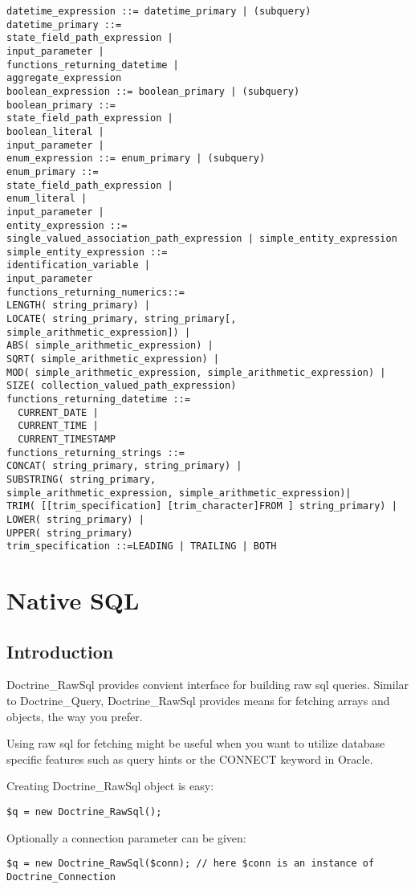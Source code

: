 \documentclass[11pt,a4paper]{report}
\begin{document}
\begin{verbatim}
datetime_expression ::= datetime_primary | (subquery)
datetime_primary ::=
state_field_path_expression |
input_parameter |
functions_returning_datetime |
aggregate_expression
boolean_expression ::= boolean_primary | (subquery)
boolean_primary ::=
state_field_path_expression |
boolean_literal |
input_parameter |
enum_expression ::= enum_primary | (subquery)
enum_primary ::=
state_field_path_expression |
enum_literal |
input_parameter |
entity_expression ::=
single_valued_association_path_expression | simple_entity_expression
simple_entity_expression ::=
identification_variable |
input_parameter
functions_returning_numerics::=
LENGTH( string_primary) |
LOCATE( string_primary, string_primary[, simple_arithmetic_expression]) |
ABS( simple_arithmetic_expression) |
SQRT( simple_arithmetic_expression) |
MOD( simple_arithmetic_expression, simple_arithmetic_expression) |
SIZE( collection_valued_path_expression)
functions_returning_datetime ::=
  CURRENT_DATE |
  CURRENT_TIME |
  CURRENT_TIMESTAMP
functions_returning_strings ::=
CONCAT( string_primary, string_primary) |
SUBSTRING( string_primary,
simple_arithmetic_expression, simple_arithmetic_expression)|
TRIM( [[trim_specification] [trim_character]FROM ] string_primary) |
LOWER( string_primary) |
UPPER( string_primary)
trim_specification ::=LEADING | TRAILING | BOTH
\end{verbatim}

\chapter{Native SQL}
\section{Introduction}
Doctrine\_RawSql provides convient interface for building raw sql queries. Similar to Doctrine\_Query, Doctrine\_RawSql provides means for fetching arrays and objects, the way you prefer.

Using raw sql for fetching might be useful when you want to utilize database specific features such as query hints or the CONNECT keyword in Oracle.

Creating Doctrine\_RawSql object is easy:

\begin{verbatim}
$q = new Doctrine_RawSql();
\end{verbatim}

Optionally a connection parameter can be given:

\begin{verbatim}
$q = new Doctrine_RawSql($conn); // here $conn is an instance of Doctrine_Connection
\end{verbatim}
\end{document}
